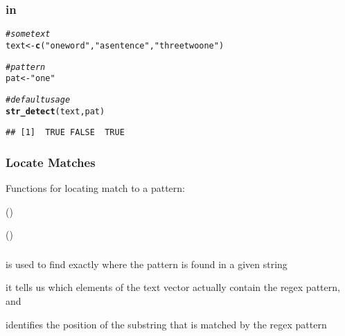 \documentclass[12pt]{beamer}\usepackage[]{graphicx}\usepackage[]{color}
\makeatletter
\newcommand{\hlstr}[1]{\textcolor[rgb]{0.192,0.494,0.8}{#1}}%
\newcommand{\hlcom}[1]{\textcolor[rgb]{0.678,0.584,0.686}{\textit{#1}}}%
\newcommand{\hlstd}[1]{\textcolor[rgb]{0.345,0.345,0.345}{#1}}%
\newcommand{\hlkwb}[1]{\textcolor[rgb]{0.69,0.353,0.396}{#1}}%
\newcommand{\hlkwd}[1]{\textcolor[rgb]{0.737,0.353,0.396}{\textbf{#1}}}%
\newenvironment{kframe}{%
 \def\at@end@of@kframe{}%
 \ifinner\ifhmode%
  \def\at@end@of@kframe{\end{minipage}}%
  \begin{minipage}{\columnwidth}%
 \fi\fi%
 \def\FrameCommand##1{\hskip\@totalleftmargin \hskip-\fboxsep
 \colorbox{shadecolor}{##1}\hskip-\fboxsep
     \hskip-\linewidth \hskip-\@totalleftmargin \hskip\columnwidth}%
 \MakeFramed {\advance\hsize-\width
   \@totalleftmargin\z@ \linewidth\hsize
   \@setminipage}}%
 {\par\unskip\endMakeFramed%
 \at@end@of@kframe}
\newenvironment{knitrout}{}{} %
\makeatother
\begin{document}

\begin{frame}[fragile]
\frametitle{ in }

\begin{knitrout}\footnotesize
{}\color{fgcolor}\begin{kframe}
\begin{alltt}
\hlcom{# some text}
\hlstd{text} \hlkwb{<-} \hlkwd{c}\hlstd{(}\hlstr{"one word"}\hlstd{,} \hlstr{"a sentence"}\hlstd{,} \hlstr{"three two one"}\hlstd{)}

\hlcom{# pattern}
\hlstd{pat} \hlkwb{<-} \hlstr{"one"}

\hlcom{# default usage}
\hlkwd{str_detect}\hlstd{(text, pat)}
\end{alltt}
\begin{verbatim}
## [1]  TRUE FALSE  TRUE
\end{verbatim}
\end{kframe}
\end{knitrout}

\end{frame}


\begin{frame}
\begin{center}
\Huge{}
\end{center}
\end{frame}


\begin{frame}
\frametitle{Locate Matches}

Functions for locating match to a pattern: 
\bbi
  \item {}
  \item {}
  \item {} ()
  \item {} ()
\ei

\end{frame}


\begin{frame}[fragile]
\frametitle{}

\bi
  \item {} is used to find exactly where the pattern is found in a given string
  \item it tells us which elements of the text vector actually contain the regex pattern, and
 \item identifies the position of the substring that is matched by the regex pattern
\ei

\end{frame}
\end{document}

